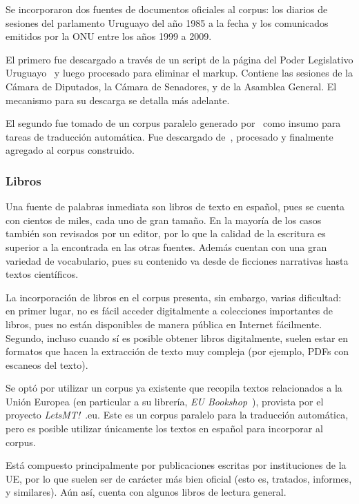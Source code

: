 Se incorporaron dos fuentes de documentos oficiales al corpus: los diarios de sesiones del
parlamento Uruguayo del año 1985 a la fecha y los comunicados emitidos por la ONU entre los años
1999 a 2009.

El primero fue descargado a través de un script de la página del Poder Legislativo
Uruguayo~\cite{ParlamentoUruguay} y luego procesado para eliminar el markup. Contiene las sesiones
de la Cámara de Diputados, la Cámara de Senadores, y de la Asamblea General. El mecanismo para su
descarga se detalla más adelante.

El segundo fue tomado de un corpus paralelo generado por~\cite{Eisele2010} como insumo para tareas
de traducción automática. Fue descargado de~\cite{MultiUNDownload}, procesado y finalmente agregado
al corpus construido.


\subsubsection{Libros}

Una fuente de palabras inmediata son libros de texto en español, pues se cuenta con cientos de
miles, cada uno de gran tamaño. En la mayoría de los casos también son revisados por un editor, por
lo que la calidad de la escritura es superior a la encontrada en las otras fuentes. Además cuentan
con una gran variedad de vocabulario, pues su contenido va desde de ficciones narrativas hasta
textos científicos.

La incorporación de libros en el corpus presenta, sin embargo, varias dificultad: en primer lugar,
no es fácil acceder digitalmente a colecciones importantes de libros, pues no están disponibles de
manera pública en Internet fácilmente. Segundo, incluso cuando sí es posible obtener libros
digitalmente, suelen estar en formatos que hacen la extracción de texto muy compleja (por ejemplo,
PDFs con escaneos del texto).

Se optó por utilizar un corpus ya existente que recopila textos relacionados a la Unión Europea (en
particular a su librería, \textit{EU Bookshop}~\cite{EUBookshop}), provista por el proyecto
\textit{LetsMT!}~\cite{LetsMT}.eu. Este es un corpus paralelo para la traducción automática, pero
es posible utilizar únicamente los textos en español para incorporar al corpus.

Está compuesto principalmente por publicaciones escritas por instituciones de la UE, por lo que
suelen ser de carácter más bien oficial (esto es, tratados, informes, y similares). Aún así, cuenta
con algunos libros de lectura general.


